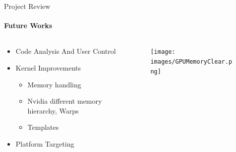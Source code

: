 	\begin{frame}[t]{Project Review}\framesubtitle{Future Works}
	\begin{columns}[T]
	\begin{column}{0.48\textwidth}
		\begin{itemize}
			\item Code Analysis And User Control
			\item Kernel Improvements
			\begin{itemize}
				\item Memory handling
				\item Nvidia different memory hierarchy, Warps
				\item Templates
			\end{itemize}
			\item Platform Targeting
		\end{itemize}
	\end{column}
	\begin{column}{.48\textwidth}
      \begin{figure}
         \texttt{[image: images/GPUMemoryClear.png]}
      \end{figure}
    \end{column}
    \end{columns}
	\end{frame}

